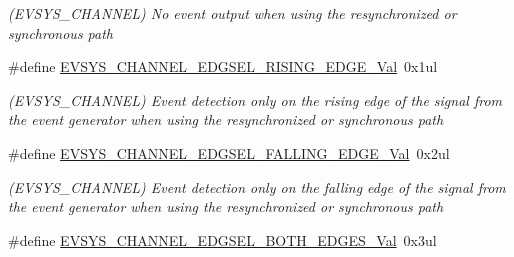 \begin{DoxyCompactItemize}
\begin{DoxyCompactList}\small\item\em (E\+V\+S\+Y\+S\+\_\+\+C\+H\+A\+N\+N\+E\+L) No event output when using the resynchronized or synchronous path \end{DoxyCompactList}\item 
\hypertarget{group___s_a_m_l21___e_v_s_y_s_ga74f200244816d34ebcda294dfa39d163}{}\#define \hyperlink{group___s_a_m_l21___e_v_s_y_s_ga74f200244816d34ebcda294dfa39d163}{E\+V\+S\+Y\+S\+\_\+\+C\+H\+A\+N\+N\+E\+L\+\_\+\+E\+D\+G\+S\+E\+L\+\_\+\+R\+I\+S\+I\+N\+G\+\_\+\+E\+D\+G\+E\+\_\+\+Val}~0x1ul\label{group___s_a_m_l21___e_v_s_y_s_ga74f200244816d34ebcda294dfa39d163}

\begin{DoxyCompactList}\small\item\em (E\+V\+S\+Y\+S\+\_\+\+C\+H\+A\+N\+N\+E\+L) Event detection only on the rising edge of the signal from the event generator when using the resynchronized or synchronous path \end{DoxyCompactList}\item 
\hypertarget{group___s_a_m_l21___e_v_s_y_s_gaea62b90832a5f319570b4fd0cdb884d5}{}\#define \hyperlink{group___s_a_m_l21___e_v_s_y_s_gaea62b90832a5f319570b4fd0cdb884d5}{E\+V\+S\+Y\+S\+\_\+\+C\+H\+A\+N\+N\+E\+L\+\_\+\+E\+D\+G\+S\+E\+L\+\_\+\+F\+A\+L\+L\+I\+N\+G\+\_\+\+E\+D\+G\+E\+\_\+\+Val}~0x2ul\label{group___s_a_m_l21___e_v_s_y_s_gaea62b90832a5f319570b4fd0cdb884d5}

\begin{DoxyCompactList}\small\item\em (E\+V\+S\+Y\+S\+\_\+\+C\+H\+A\+N\+N\+E\+L) Event detection only on the falling edge of the signal from the event generator when using the resynchronized or synchronous path \end{DoxyCompactList}\item 
\hypertarget{group___s_a_m_l21___e_v_s_y_s_ga30ceae6c03e9e5fb6302f5f4d234599d}{}\#define \hyperlink{group___s_a_m_l21___e_v_s_y_s_ga30ceae6c03e9e5fb6302f5f4d234599d}{E\+V\+S\+Y\+S\+\_\+\+C\+H\+A\+N\+N\+E\+L\+\_\+\+E\+D\+G\+S\+E\+L\+\_\+\+B\+O\+T\+H\+\_\+\+E\+D\+G\+E\+S\+\_\+\+Val}~0x3ul\label{group___s_a_m_l21___e_v_s_y_s_ga30ceae6c03e9e5fb6302f5f4d234599d}


\end{DoxyCompactItemize}
